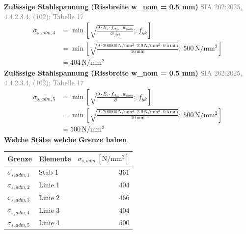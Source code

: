 \documentclass[11pt,a4paper]{article}
\newcommand{\normref}[1]{{\small\textcolor{gray}{#1}}}
\begin{document}
\noindent\textbf{Zulässige Stahlspannung (Rissbreite w\_nom = 0.5 mm)} \hfill \normref{SIA 262:2025, 4.4.2.3.4, (102); Tabelle 17}
\begin{equation*}
\begin{aligned}
  \sigma_{s,adm,4} &= \min\left[\sqrt{\frac{9 \cdot E_s \cdot f_{ctm} \cdot w_{nom}}{\varnothing_{fikt}}};\ f_{yk}\right] \\
  &= \min\left[\sqrt{\frac{9 \cdot 200000\,\mathrm{N}/\mathrm{mm}^{2} \cdot 2.9\,\mathrm{N}/\mathrm{mm}^{2} \cdot 0.5\,\mathrm{mm}}{16\,\mathrm{mm}}};\ 500\,\mathrm{N}/\mathrm{mm}^{2}\right] \\
  &= 404\,\mathrm{N}/\mathrm{mm}^{2}
\end{aligned}
\end{equation*}
\noindent\textbf{Zulässige Stahlspannung (Rissbreite w\_nom = 0.5 mm)} \hfill \normref{SIA 262:2025, 4.4.2.3.4, (102); Tabelle 17}
\begin{equation*}
\begin{aligned}
  \sigma_{s,adm,5} &= \min\left[\sqrt{\frac{9 \cdot E_s \cdot f_{ctm} \cdot w_{nom}}{\varnothing}};\ f_{yk}\right] \\
  &= \min\left[\sqrt{\frac{9 \cdot 200000\,\mathrm{N}/\mathrm{mm}^{2} \cdot 2.9\,\mathrm{N}/\mathrm{mm}^{2} \cdot 0.5\,\mathrm{mm}}{10\,\mathrm{mm}}};\ 500\,\mathrm{N}/\mathrm{mm}^{2}\right] \\
  &= 500\,\mathrm{N}/\mathrm{mm}^{2}
\end{aligned}
\end{equation*}
\noindent\textbf{Welche Stäbe welche Grenze haben}
\begin{longtable}{llr}
\hline
Grenze & Elemente & $\sigma_{s,adm}\ [\mathrm{N/mm^2}]$ \\
\hline
\endhead
$\sigma_{s,adm,1}$ & Stab 1 & $361$ \\
$\sigma_{s,adm,2}$ & Linie 1 & $404$ \\
$\sigma_{s,adm,3}$ & Linie 2 & $466$ \\
$\sigma_{s,adm,4}$ & Linie 3 & $404$ \\
$\sigma_{s,adm,5}$ & Linie 4 & $500$ \\
\hline
\end{longtable}
\end{document}

